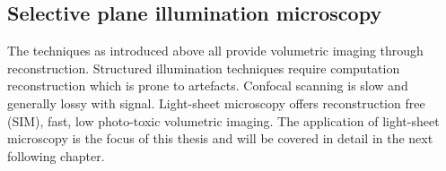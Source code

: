 \subsection{Selective plane illumination microscopy}

The techniques as introduced above all provide volumetric imaging through reconstruction.
Structured illumination techniques require computation reconstruction which is prone to artefacts.
Confocal scanning is slow and generally lossy with signal.
Light-sheet microscopy offers reconstruction free (SIM), fast, low photo-toxic volumetric imaging.
The application of light-sheet microscopy is the focus of this thesis and will be covered in detail in the next following chapter.

